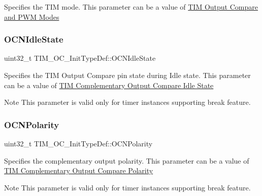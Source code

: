 Specifies the T\+IM mode. This parameter can be a value of \hyperlink{group___t_i_m___output___compare__and___p_w_m__modes}{T\+IM Output Compare and P\+WM Modes} \mbox{\label{struct_t_i_m___o_c___init_type_def_a0d70cc51990d7433fd76cc6ed1d06237}} 
\subsubsection{\texorpdfstring{O\+C\+N\+Idle\+State}{OCNIdleState}}
{\footnotesize\ttfamily uint32\+\_\+t T\+I\+M\+\_\+\+O\+C\+\_\+\+Init\+Type\+Def\+::\+O\+C\+N\+Idle\+State}

Specifies the T\+IM Output Compare pin state during Idle state. This parameter can be a value of \hyperlink{group___t_i_m___output___compare___n___idle___state}{T\+IM Complementary Output Compare Idle State} \begin{DoxyNote}{Note}
This parameter is valid only for timer instances supporting break feature. 
\end{DoxyNote}
\mbox{\label{struct_t_i_m___o_c___init_type_def_a21922d8e2fee659d081c4be4c500d1d4}} 
\subsubsection{\texorpdfstring{O\+C\+N\+Polarity}{OCNPolarity}}
{\footnotesize\ttfamily uint32\+\_\+t T\+I\+M\+\_\+\+O\+C\+\_\+\+Init\+Type\+Def\+::\+O\+C\+N\+Polarity}

Specifies the complementary output polarity. This parameter can be a value of \hyperlink{group___t_i_m___output___compare___n___polarity}{T\+IM Complementary Output Compare Polarity} \begin{DoxyNote}{Note}
This parameter is valid only for timer instances supporting break feature. 
\end{DoxyNote}
\mbox{\label{struct_t_i_m___o_c___init_type_def_a556b7137d041aceed3e45c87cbfb39cd}} 
